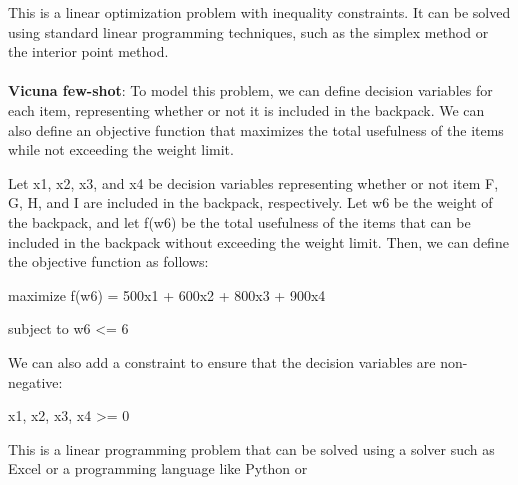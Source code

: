 \documentclass{article}%
\begin{document}
This is a linear optimization problem with inequality constraints. It can be solved using standard linear programming techniques, such as the simplex method or the interior point method.\\\\%
\textbf{Vicuna few-shot}: To model this problem, we can define decision variables for each item, representing whether or not it is included in the backpack. We can also define an objective function that maximizes the total usefulness of the items while not exceeding the weight limit.

Let x1, x2, x3, and x4 be decision variables representing whether or not item F, G, H, and I are included in the backpack, respectively. Let w6 be the weight of the backpack, and let f(w6) be the total usefulness of the items that can be included in the backpack without exceeding the weight limit. Then, we can define the objective function as follows:

maximize f(w6) = 500x1 + 600x2 + 800x3 + 900x4

subject to w6 <= 6

We can also add a constraint to ensure that the decision variables are non-negative:

x1, x2, x3, x4 >= 0

This is a linear programming problem that can be solved using a solver such as Excel or a programming language like Python or\\\\%
\end{document}
